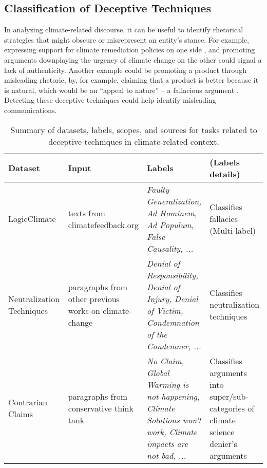\subsection{Classification of Deceptive Techniques}
\label{sec:deceptive}

In analyzing climate-related discourse, it can be useful to identify rhetorical strategies that might obscure or misrepresent an entity’s stance. 
For example, expressing support for climate remediation policies on one side \cite{morio2023an}, and promoting arguments downplaying the urgency of climate change on the other \cite{coanComputerassistedClassificationContrarian2021} could signal a lack of authenticity. Another example could be promoting a product through misleading rhetoric, by, for example, claiming that a product is better because it is natural, which would be an ``appeal to nature'' -- a fallacious argument \cite{vaid-etal-2022-towards, jain_supply_2023}.
Detecting these deceptive techniques could help identify misleading communications.

\begin{table}[ht]
\centering
\begin{tabular}{p{3cm}p{3cm}p{4cm}p{4cm}}
\toprule
\textbf{Dataset}  & \textbf{Input}  & \textbf{Labels}                                                                                  & \textbf{(Labels details)}                                        \\
\midrule
LogicClimate~\cite{jin-etal-2022-logical}  & texts from climatefeedback.org  & \textit{Faulty Generalization, Ad Hominem, Ad Populum, False Causality, ...} & Classifies fallacies (Multi-label)\\
\midrule
\raggedright Neutralization Techniques~\cite{bhatia_automatic_2021-1} & paragraphs from other previous works on climate-change & \textit{Denial of Responsibility, Denial of Injury, Denial of Victim, Condemnation of the Condemner, ...} & Classifies neutralization techniques  \\
\midrule
Contrarian Claims~\cite{coanComputerassistedClassificationContrarian2021} & paragraphs from conservative think tank & \textit{No Claim, Global Warming is not happening, Climate Solutions won't work, Climate impacts are not bad, ...} & Classifies arguments into  super/sub-categories of climate science denier's arguments  \\
\bottomrule
\end{tabular}
\caption{Summary of datasets, labels, scopes, and sources for tasks related to deceptive techniques in climate-related context.}
\label{tab:datasets_deceptive}
\end{table}

